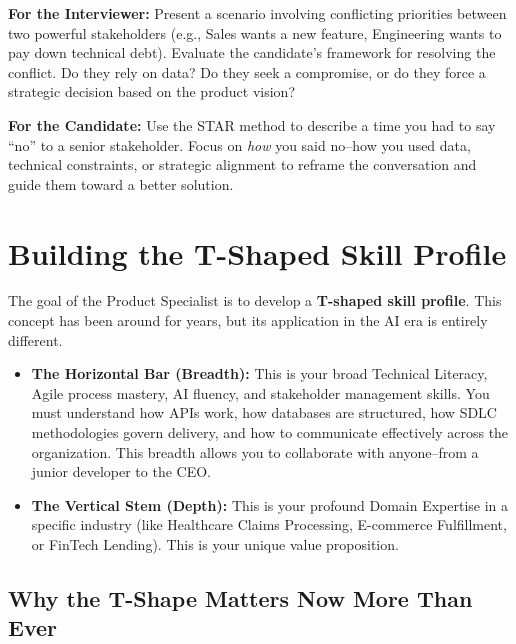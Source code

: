 \documentclass[
  11pt,
  openany,
  oneside]{book}
\providecommand{\tightlist}{%
  \setlength{\itemsep}{0pt}\setlength{\parskip}{0pt}}
\renewenvironment{quote}{\begin{customquote}}{\end{customquote}}
\begin{document}
\begin{quote}
\textbf{For the Interviewer:} Present a scenario involving conflicting
priorities between two powerful stakeholders (e.g., Sales wants a new
feature, Engineering wants to pay down technical debt). Evaluate the
candidate's framework for resolving the conflict. Do they rely on data?
Do they seek a compromise, or do they force a strategic decision based
on the product vision?
\end{quote}

\begin{quote}
\textbf{For the Candidate:} Use the STAR method to describe a time you
had to say ``no'' to a senior stakeholder. Focus on \emph{how} you said
no--how you used data, technical constraints, or strategic alignment to
reframe the conversation and guide them toward a better solution.
\end{quote}

\bigskip

\section{Building the T-Shaped Skill
Profile}\label{building-the-t-shaped-skill-profile}

The goal of the Product Specialist is to develop a \textbf{T-shaped
skill profile}. This concept has been around for years, but its
application in the AI era is entirely different.

\begin{itemize}
\tightlist
\item
  \textbf{The Horizontal Bar (Breadth):} This is your broad Technical
  Literacy, Agile process mastery, AI fluency, and stakeholder
  management skills. You must understand how APIs work, how databases
  are structured, how SDLC methodologies govern delivery, and how to
  communicate effectively across the organization. This breadth allows
  you to collaborate with anyone--from a junior developer to the CEO.
\item
  \textbf{The Vertical Stem (Depth):} This is your profound Domain
  Expertise in a specific industry (like Healthcare Claims Processing,
  E-commerce Fulfillment, or FinTech Lending). This is your unique value
  proposition.
\end{itemize}

\subsection{Why the T-Shape Matters Now More Than
Ever}\label{why-the-t-shape-matters-now-more-than-ever}
\end{document}
